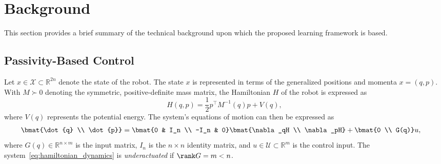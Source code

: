 \section{Background}

This section provides a brief summary of the technical background upon which the
proposed learning framework is based. 


\subsection{Passivity-Based Control}
\label{ssec:pbc}

Let $x \in \mathcal{X} \subset \mathbb{R}^{2n}$ denote the state of the robot.
%
The state $x$ is represented in terms of the generalized positions and momenta
$x = (q, p)$. 
%
With $M \succ 0$ denoting the symmetric, positive-definite mass matrix, the
Hamiltonian $H$ of the robot is expressed as 
%
\begin{equation}
    H(q,p) = \frac{1}{2} p^\top M^{-1}(q) p + V(q),
    \label{eq:system_hamiltonian}
\end{equation}
%
where $V(q)$ represents the potential energy. The system's equations of motion
can then be expressed as 
%
\begin{align}
    \begin{split}  
      \bmat{\dot{q} \\ \dot{p}} &= \bmat{0 & I_n \\ -I_n & 0}\bmat{\nabla_qH \\
      \nabla_pH} + \bmat{0 \\ G(q)}u,
    \end{split}
    \label{eq:hamiltonian_dynamics}
\end{align}
%
where $G(q) \in \mathbb{R}^{n \times m}$ is the input matrix, $I_n$ is the
$n \times n$ identity matrix, and $u \in \mathcal{U} \subset \mathbb{R}^m$ is
the control input.
%
The system~\eqref{eq:hamiltonian_dynamics} is \textit{underactuated} if $\rank G
= m < n$.




